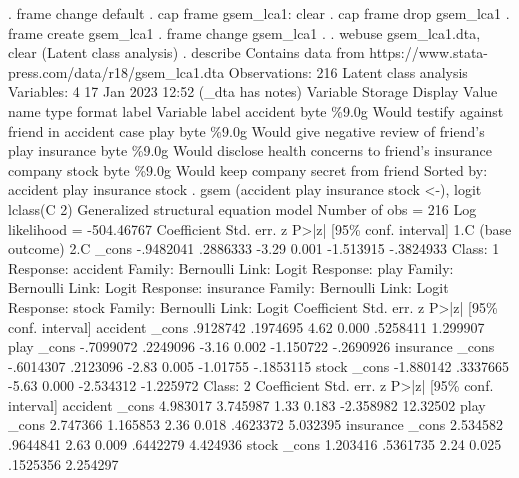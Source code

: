 . frame change default
{\smallskip}
. cap frame gsem_lca1: clear
{\smallskip}
. cap frame drop gsem_lca1 
{\smallskip}
. frame create gsem_lca1
{\smallskip}
. frame change gsem_lca1
{\smallskip}
. 
. webuse gsem_lca1.dta, clear
(Latent class analysis)
{\smallskip}
. describe
{\smallskip}
Contains data from https://www.stata-press.com/data/r18/gsem_lca1.dta
 Observations:           216                  Latent class analysis
    Variables:             4                  17 Jan 2023 12:52
                                              (_dta has notes)
Variable      Storage   Display    Value
    name         type    format    label      Variable label
accident        byte    \%9.0g                 Would testify against friend in accident case
play            byte    \%9.0g                 Would give negative review of friend's play
insurance       byte    \%9.0g                 Would disclose health concerns to friend's
                                                insurance company
stock           byte    \%9.0g                 Would keep company secret from friend
Sorted by: accident  play  insurance  stock
{\smallskip}
. gsem (accident play insurance stock <-), logit lclass(C 2)
{\oom}
Generalized structural equation model                      Number of obs = 216
Log likelihood = -504.46767
{\smallskip}
             {\VBAR} Coefficient  Std. err.      z    P>|z|     [95\% conf. interval]
1.C          {\VBAR}  (base outcome)
2.C          {\VBAR}
       _cons {\VBAR}  -.9482041   .2886333    -3.29   0.001    -1.513915   -.3824933
{\smallskip}
Class:    1        
{\smallskip}
Response: accident 
Family:   Bernoulli
Link:     Logit    
{\smallskip}
Response: play     
Family:   Bernoulli
Link:     Logit    
{\smallskip}
Response: insurance
Family:   Bernoulli
Link:     Logit    
{\smallskip}
Response: stock    
Family:   Bernoulli
Link:     Logit    
{\smallskip}
             {\VBAR} Coefficient  Std. err.      z    P>|z|     [95\% conf. interval]
accident     {\VBAR}
       _cons {\VBAR}   .9128742   .1974695     4.62   0.000     .5258411    1.299907
play         {\VBAR}
       _cons {\VBAR}  -.7099072   .2249096    -3.16   0.002    -1.150722   -.2690926
insurance    {\VBAR}
       _cons {\VBAR}  -.6014307   .2123096    -2.83   0.005     -1.01755   -.1853115
stock        {\VBAR}
       _cons {\VBAR}  -1.880142   .3337665    -5.63   0.000    -2.534312   -1.225972
{\smallskip}
Class:    2        
{\oom}
             {\VBAR} Coefficient  Std. err.      z    P>|z|     [95\% conf. interval]
accident     {\VBAR}
       _cons {\VBAR}   4.983017   3.745987     1.33   0.183    -2.358982    12.32502
play         {\VBAR}
       _cons {\VBAR}   2.747366   1.165853     2.36   0.018     .4623372    5.032395
insurance    {\VBAR}
       _cons {\VBAR}   2.534582   .9644841     2.63   0.009     .6442279    4.424936
stock        {\VBAR}
       _cons {\VBAR}   1.203416   .5361735     2.24   0.025     .1525356    2.254297
